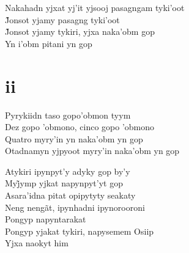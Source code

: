 \begin{linenumbers}\begingroup\raggedright
 
\noindent   Nakahadn yjxat yj'it yjsooj pasagngam tyki'oot\\
  J̃onsot yjamy pasagng tyki’oot\\
  J̃onsot yjamy tykiri, yjxa naka’obm gop\\
  Yn i’obm pitani yn gop
 
 
\medskip
\section{ii}

  \noindent Pyrykiidn taso gopo'obmon tyym\\
  Dez gopo 'obmono, cinco gopo 'obmono\\
  Quatro myry'in yn naka'obm yn gop\\
  Otadnamyn yjpyoot myry'in naka'obm yn gop
 
\end{linenumbers}\endgroup

\bigskip

\begin{linenumbers}\begingroup\raggedright
 
\noindent   Atykiri ipynpyt'y adyky gop by'y\\
  Myj̃ymp yjkat napynpyt’yt gop\\
  Asara'idna pitat opipytyty seakaty\\
  Neng nengãt, ipynhadni ipynorooroni\\
  Pongyp napyntarakat\\
  Pongyp yjakat tykiri, napysemem Osiip\\
  Yjxa naokyt him
 
\end{linenumbers}\endgroup


